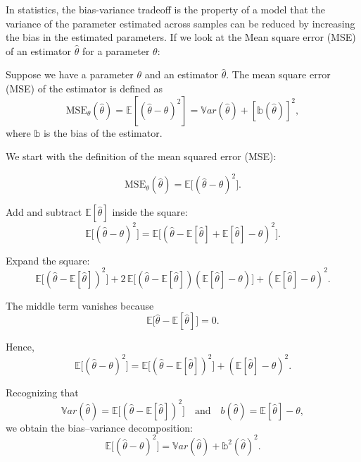 \documentclass[
  letterpaper,
  DIV=11,
  numbers=noendperiod]{scrreprt}
\begin{document}
In statistics, the bias-variance tradeoff is the property of a model
that the variance of the parameter estimated across samples can be
reduced by increasing the bias in the estimated parameters. If we look
at the Mean square error (MSE) of an estimator \(\hat \theta\) for a
parameter \(\theta\):

Suppose we have a parameter \(\theta\) and an estimator \(\hat \theta\).
The mean square error (MSE) of the estimator is defined as
\[\mathrm{MSE}_{\theta}(\hat \theta)=\mathbb E[(\hat \theta-\theta )^2 ]= \mathbb{V}ar(\hat \theta) + [\mathbb b(\hat \theta)]^2,\]
where \(\mathbb b\) is the bias of the estimator.

\begin{tcolorbox}[enhanced jigsaw, bottomtitle=1mm, rightrule=.15mm, colframe=quarto-callout-note-color-frame, coltitle=black, opacitybacktitle=0.6, breakable, colbacktitle=quarto-callout-note-color!10!white, leftrule=.75mm, toptitle=1mm, titlerule=0mm, toprule=.15mm, opacityback=0, title=\textcolor{quarto-callout-note-color}{\faInfo}\hspace{0.5em}{Derivation}, colback=white, arc=.35mm, bottomrule=.15mm, left=2mm]

We start with the definition of the mean squared error (MSE):

\[
\mathrm{MSE}_\theta(\hat \theta)
= \mathbb E\big[(\hat \theta- \theta)^2\big].
\]

Add and subtract \(\mathbb E[\hat \theta]\) inside the square: \[
\mathbb E\big[(\hat \theta- \theta)^2\big]
= \mathbb E\big[(\hat \theta- \mathbb E[\hat \theta] + \mathbb E[\hat \theta] - \theta)^2\big].
\]

Expand the square: \[
\mathbb E\big[(\hat \theta- \mathbb E[\hat \theta])^2\big]
+ 2\,\mathbb E\big[(\hat \theta- \mathbb E[\hat \theta])(\mathbb E[\hat \theta] - \theta)\big]
+ (\mathbb E[\hat \theta] - \theta)^2.
\]

The middle term vanishes because \[
\mathbb E\big[\hat \theta- \mathbb E[\hat \theta]\big] = 0.
\]

Hence, \[
\mathbb E\big[(\hat \theta- \theta)^2\big]
= \mathbb E\big[(\hat \theta- \mathbb E[\hat \theta])^2\big]
+ (\mathbb E[\hat \theta] - \theta)^2.
\]

Recognizing that \[
\mathbb{V}ar(\hat \theta) = \mathbb E\big[(\hat \theta- \mathbb E[\hat \theta])^2\big]
\quad \text{and} \quad
b(\hat \theta) = \mathbb E[\hat \theta] - \theta,
\] we obtain the bias--variance decomposition: \[
\boxed{
\mathbb E\big[(\hat \theta- \theta)^2\big]
= \mathbb{V}ar(\hat \theta) + \mathbb b^2(\hat \theta)^2.}
\]

\end{tcolorbox}
\end{document}
